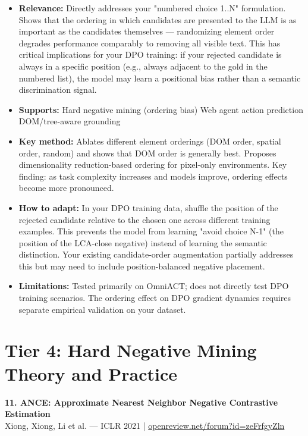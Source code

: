 \documentclass[pdflatex,sn-mathphys-num]{sn-jnl}
\theoremstyle{thmstyleone}
\theoremstyle{thmstyletwo}
\theoremstyle{thmstylethree}
\begin{document}
\begin{itemize}
    \item \textbf{Relevance:} Directly addresses your "numbered choice 1..N" formulation. Shows that the ordering in which candidates are presented to the LLM is as important as the candidates themselves --- randomizing element order degrades performance comparably to removing all visible text. This has critical implications for your DPO training: if your rejected candidate is always in a specific position (e.g., always adjacent to the gold in the numbered list), the model may learn a positional bias rather than a semantic discrimination signal.
    \item \textbf{Supports:} \checkmark Hard negative mining (ordering bias) \checkmark Web agent action prediction \checkmark DOM/tree-aware grounding
    \item \textbf{Key method:} Ablates different element orderings (DOM order, spatial order, random) and shows that DOM order is generally best. Proposes dimensionality reduction-based ordering for pixel-only environments. Key finding: as task complexity increases and models improve, ordering effects become more pronounced.
    \item \textbf{How to adapt:} In your DPO training data, shuffle the position of the rejected candidate relative to the chosen one across different training examples. This prevents the model from learning "avoid choice N-1" (the position of the LCA-close negative) instead of learning the semantic distinction. Your existing candidate-order augmentation partially addresses this but may need to include position-balanced negative placement.
    \item \textbf{Limitations:} Tested primarily on OmniACT; does not directly test DPO training scenarios. The ordering effect on DPO gradient dynamics requires separate empirical validation on your dataset.
\end{itemize}

\section{Tier 4: Hard Negative Mining Theory and Practice}

\textbf{11. ANCE: Approximate Nearest Neighbor Negative Contrastive Estimation} \\
Xiong, Xiong, Li et al. --- ICLR 2021 | \href{https://openreview.net/forum?id=zeFrfgyZln}{openreview.net/forum?id=zeFrfgyZln}
\end{document}
